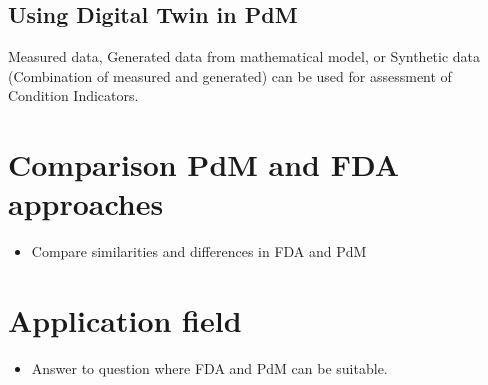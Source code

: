 \subsection{Using Digital Twin in PdM}

Measured data, Generated data from mathematical model, or Synthetic data
(Combination of measured and generated) can be used for assessment of
Condition Indicators. 


\section{Comparison PdM and FDA approaches}
\begin{itemize}
    \item Compare similarities and differences in FDA and PdM
\end{itemize}

\section{Application field}
\begin{itemize}
    \item Answer to question where FDA and PdM can be suitable.
\end{itemize}
